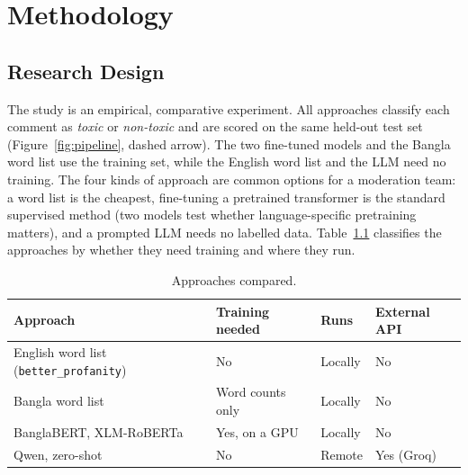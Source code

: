 \chapter{Methodology}
\justifying

\section{Research Design}

The study is an empirical, comparative experiment. All approaches classify each comment as \emph{toxic} or \emph{non-toxic} and are scored on the same held-out test set (Figure~\ref{fig:pipeline}, dashed arrow). The two fine-tuned models and the Bangla word list use the training set, while the English word list and the LLM need no training. The four kinds of approach are common options for a moderation team: a word list is the cheapest, fine-tuning a pretrained transformer is the standard supervised method (two models test whether language-specific pretraining matters), and a prompted LLM needs no labelled data. Table~\ref{tab:approaches} classifies the approaches by whether they need training and where they run.

\begin{table}[H]
  \centering
  \caption{Approaches compared.}
  \label{tab:approaches}
  \small
  \begin{tabular}{llll}
    \toprule
    \textbf{Approach} & \textbf{Training needed} & \textbf{Runs} & \textbf{External API} \\
    \midrule
    English word list (\texttt{better\_profanity}) & No & Locally & No \\
    Bangla word list & Word counts only & Locally & No \\
    BanglaBERT, XLM-RoBERTa & Yes, on a GPU & Locally & No \\
    Qwen, zero-shot & No & Remote & Yes (Groq) \\
    \bottomrule
  \end{tabular}
\end{table}

